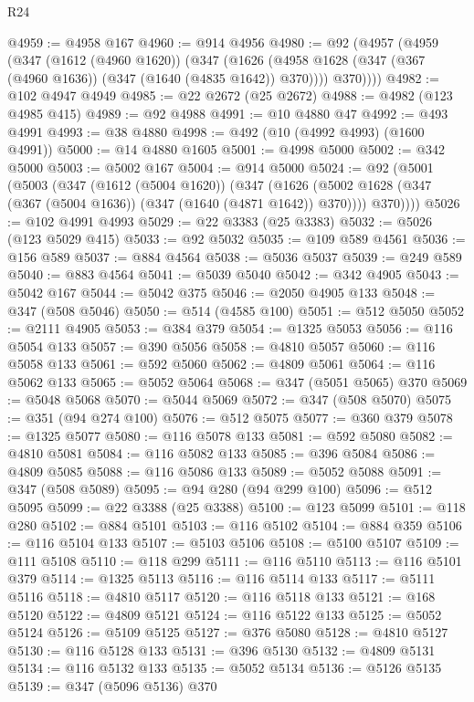 \begin{lexlean}{R24}
\begin{coremodule}
@4959 := @4958 @167
@4960 := @914 @4956
@4980 := @92
    (@4957
      (@4959
        (@347
          (@1612 (@4960 @1620))
          (@347
            (@1626 (@4958 @1628 (@347 (@367 (@4960 @1636)) (@347 (@1640 (@4835 @1642)) @370))))
            @370))))
@4982 := @102 @4947 @4949
@4985 := @22 @2672 (@25 @2672)
@4988 := @4982 (@123 @4985 @415)
@4989 := @92 @4988
@4991 := @10 @4880 @47
@4992 := @493 @4991
@4993 := @38 @4880
@4998 := @492 (@10 (@4992 @4993) (@1600 @4991))
@5000 := @14 @4880 @1605
@5001 := @4998 @5000
@5002 := @342 @5000
@5003 := @5002 @167
@5004 := @914 @5000
@5024 := @92
    (@5001
      (@5003
        (@347
          (@1612 (@5004 @1620))
          (@347
            (@1626 (@5002 @1628 (@347 (@367 (@5004 @1636)) (@347 (@1640 (@4871 @1642)) @370))))
            @370))))
@5026 := @102 @4991 @4993
@5029 := @22 @3383 (@25 @3383)
@5032 := @5026 (@123 @5029 @415)
@5033 := @92 @5032
@5035 := @109 @589 @4561
@5036 := @156 @589
@5037 := @884 @4564
@5038 := @5036 @5037
@5039 := @249 @589
@5040 := @883 @4564
@5041 := @5039 @5040
@5042 := @342 @4905
@5043 := @5042 @167
@5044 := @5042 @375
@5046 := @2050 @4905 @133
@5048 := @347 (@508 @5046)
@5050 := @514 (@4585 @100)
@5051 := @512 @5050
@5052 := @2111 @4905
@5053 := @384 @379
@5054 := @1325 @5053
@5056 := @116 @5054 @133
@5057 := @390 @5056
@5058 := @4810 @5057
@5060 := @116 @5058 @133
@5061 := @592 @5060
@5062 := @4809 @5061
@5064 := @116 @5062 @133
@5065 := @5052 @5064
@5068 := @347 (@5051 @5065) @370
@5069 := @5048 @5068
@5070 := @5044 @5069
@5072 := @347 (@508 @5070)
@5075 := @351 (@94 @274 @100)
@5076 := @512 @5075
@5077 := @360 @379
@5078 := @1325 @5077
@5080 := @116 @5078 @133
@5081 := @592 @5080
@5082 := @4810 @5081
@5084 := @116 @5082 @133
@5085 := @396 @5084
@5086 := @4809 @5085
@5088 := @116 @5086 @133
@5089 := @5052 @5088
@5091 := @347 (@508 @5089)
@5095 := @94 @280 (@94 @299 @100)
@5096 := @512 @5095
@5099 := @22 @3388 (@25 @3388)
@5100 := @123 @5099
@5101 := @118 @280
@5102 := @884 @5101
@5103 := @116 @5102
@5104 := @884 @359
@5106 := @116 @5104 @133
@5107 := @5103 @5106
@5108 := @5100 @5107
@5109 := @111 @5108
@5110 := @118 @299
@5111 := @116 @5110
@5113 := @116 @5101 @379
@5114 := @1325 @5113
@5116 := @116 @5114 @133
@5117 := @5111 @5116
@5118 := @4810 @5117
@5120 := @116 @5118 @133
@5121 := @168 @5120
@5122 := @4809 @5121
@5124 := @116 @5122 @133
@5125 := @5052 @5124
@5126 := @5109 @5125
@5127 := @376 @5080
@5128 := @4810 @5127
@5130 := @116 @5128 @133
@5131 := @396 @5130
@5132 := @4809 @5131
@5134 := @116 @5132 @133
@5135 := @5052 @5134
@5136 := @5126 @5135
@5139 := @347 (@5096 @5136) @370

\end{coremodule}
\end{lexlean}
